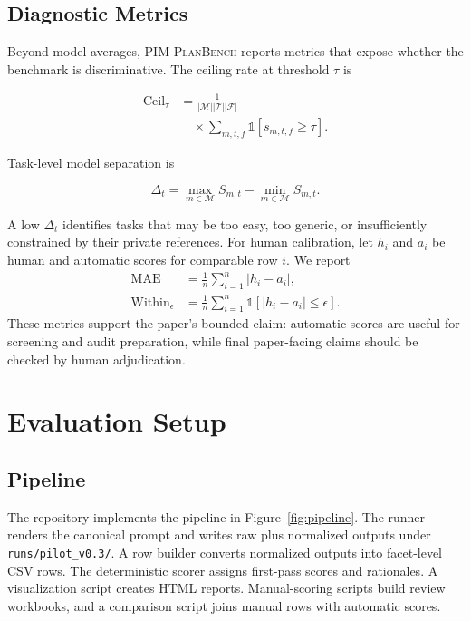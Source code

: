 \documentclass[11pt]{article}
\newcommand{\pimplanbench}{\textsc{PIM-PlanBench}}
\newcommand{\facetset}{\mathcal{F}}
\newcommand{\taskset}{\mathcal{T}}
\newcommand{\modelset}{\mathcal{M}}
\begin{document}
\subsection{Diagnostic Metrics}

Beyond model averages, \pimplanbench{} reports metrics that expose whether the benchmark is discriminative. The ceiling rate at threshold $\tau$ is

\begin{equation}
\begin{aligned}
\mathrm{Ceil}_{\tau}
&=
\frac{1}{|\modelset||\taskset||\facetset|} \\
&\quad \times
\sum_{m,t,f}\mathbb{1}[s_{m,t,f}\ge \tau].
\end{aligned}
\end{equation}

Task-level model separation is


\begin{equation}
\Delta_t = \max_{m \in \modelset} S_{m,t} - \min_{m \in \modelset} S_{m,t}.
\end{equation}

A low $\Delta_t$ identifies tasks that may be too easy, too generic, or insufficiently constrained by their private references. For human calibration, let $h_i$ and $a_i$ be human and automatic scores for comparable row $i$. We report
\begin{align}
\mathrm{MAE} &= \frac{1}{n}\sum_{i=1}^{n}|h_i-a_i|, \\
\mathrm{Within}_{\epsilon} &= \frac{1}{n}\sum_{i=1}^{n}\mathbb{1}[|h_i-a_i|\le \epsilon].
\end{align}
These metrics support the paper's bounded claim: automatic scores are useful for screening and audit preparation, while final paper-facing claims should be checked by human adjudication.

\section{Evaluation Setup}

\subsection{Pipeline}

The repository implements the pipeline in Figure~\ref{fig:pipeline}. The runner renders the canonical prompt and writes raw plus normalized outputs under \texttt{runs/pilot\_v0.3/}. A row builder converts normalized outputs into facet-level CSV rows. The deterministic scorer assigns first-pass scores and rationales. A visualization script creates HTML reports. Manual-scoring scripts build review workbooks, and a comparison script joins manual rows with automatic scores.
\end{document}

